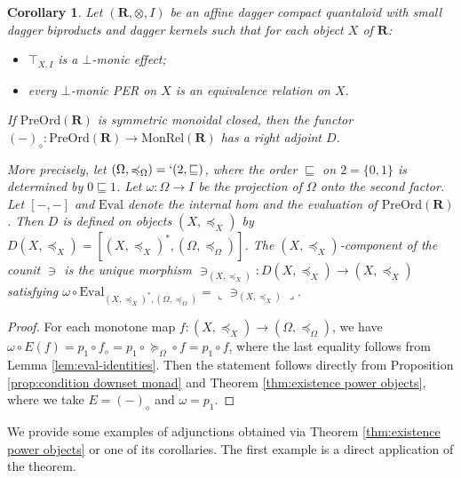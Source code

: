 \documentclass[12pt]{tac}
\newtheorem{corollary}[theorem]{Corollary}
\theoremstyle{definition}
\theoremstyle{remark}
\newcommand{\qo}{{\boldsymbol{\preccurlyeq}}}
\newcommand{\qop}{{\boldsymbol{\succcurlyeq}}}
\newcommand{\<}{\langle}
\renewcommand{\>}{\rangle}
\renewcommand{\:}{\colon}
\newcommand{\Eval}{\mathrm{Eval}}
\newcommand{\coname}[1]{\llcorner #1\lrcorner}
\begin{document}
\begin{corollary}\label{cor:lower set functor}
    Let $(\mathbf R,\otimes,I)$ be an affine dagger compact quantaloid with small dagger biproducts and dagger kernels such that for each object $X$ of $\mathbf R$:
    \begin{itemize}
        \item[(1)] $\top_{X,I}$ is a $\bot$-monic effect;
        \item[(2)] every $\bot$-monic PER on $X$ is an equivalence relation on $X$.
    \end{itemize}
    If $\mathrm{PreOrd}(\mathbf R)$ is symmetric monoidal closed, then the functor $(-)_\diamond:\mathrm{PreOrd}(\mathbf R)\to\mathrm{MonRel}(\mathbf R)$ has a right adjoint $D$.

    More precisely, let $(\Omega,\qo_\Omega)=`(2,\sqsubseteq)$, where the order $\sqsubseteq$ on $2=\{0,1\}$ is determined by $0\sqsubseteq 1$. Let $\omega:\Omega\to I$ be the projection of $\Omega$ onto the second factor. Let $[-,-]$ and $\Eval$ denote the internal hom and the evaluation of $\mathrm{PreOrd}(\mathbf R)$. Then $D$ is defined on objects $(X,\qo_X)$ by $D(X,\qo_X)=[(X,\qo_X)^*,(\Omega,\qo_\Omega)]$. The $(X,\qo_X)$-component of the counit $\ni$ is the unique morphism $\ni_{(X,\qo_X)}:D(X,\qo_X)\to (X,\qo_X)$ satisfying $\omega\circ\Eval_{(X,\qo_X)^*,(\Omega,\qo_\Omega)}=\coname{\ni_{(X,
    \qo_X)}}$.
\end{corollary}
\begin{proof}
 For each monotone map $f:(X,\qo_X)\to(\Omega,\qo_\Omega)$, we have $\omega\circ E(f)=p_1\circ f_\diamond=p_1\circ \qop_\Omega\circ f=p_1\circ f$, where the last equality follows from Lemma \ref{lem:eval-identities}. Then the statement follows directly from Proposition \ref{prop:condition downset monad} and Theorem \ref{thm:existence power objects}, where we take $E=(-)_\diamond$ and $\omega=p_1$.
\end{proof}


We provide some examples of adjunctions obtained via Theorem \ref{thm:existence power objects} or one of its corollaries. The first example is a direct application of the theorem. 
\end{document}
